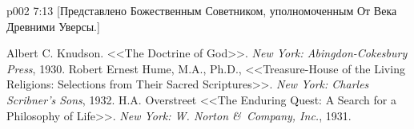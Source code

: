 \vsetoff
\vs p002 7:13 [Представлено Божественным Советником, уполномоченным От Века Древними Уверсы.]
\quizlink
\begin{thebibliography}{100}
Albert C. Knudson.
{<<The Doctrine of God>>.}
{\em New York: Abingdon-Cokesbury Press}, 1930.
Robert Ernest Hume, M.A., Ph.D.,
{<<Treasure\hyp{}House of the Living Religions: Selections from Their Sacred Scriptures>>.}
{\em New York: Charles Scribner's Sons}, 1932.
H.A. Overstreet
{<<The Enduring Quest: A Search for a Philosophy of Life>>.}
{\em New York: W. Norton \&\ Company, Inc.}, 1931.
\end{thebibliography}
